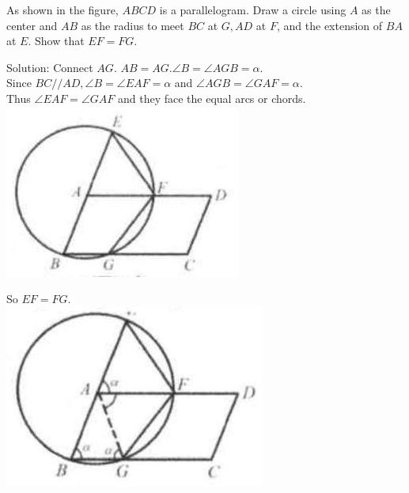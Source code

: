 \documentclass{article}
\begin{document}
As shown in the figure, \(A B C D\) is a parallelogram. Draw a circle using \(A\) as the center and \(A B\) as the radius to meet \(B C\) at \(G, A D\) at \(F\), and the extension of \(B A\) at \(E\). Show that \(E F=F G\).

Solution:
Connect \(A G\). \(A B=A G . \angle B=\angle A G B=\alpha\).\\
Since \(B C / / A D, \angle B=\angle E A F=\alpha\) and \(\angle A G B=\angle G A F=\alpha\).\\
Thus \(\angle E A F=\angle G A F\) and they face the equal arcs or chords.\\
\centering
\includegraphics[width=\textwidth]{images/148(3).jpg}

So \(E F=F G\).\\
\centering
\includegraphics[width=\textwidth]{images/148(2).jpg}
\end{document}
